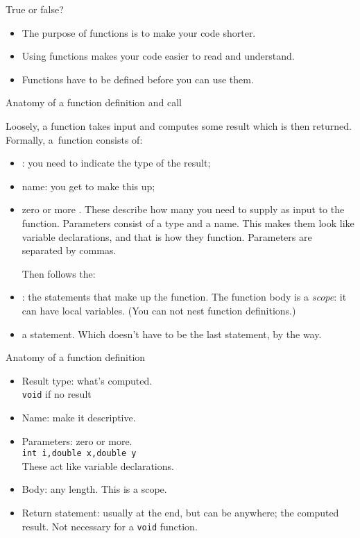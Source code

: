 \begin{review}
  \label{rev:func-why}
  True or false?
  \begin{itemize}
  \item The purpose of functions is to make your code shorter.
  \item Using functions makes your code easier to read and understand.
  \item Functions have to be defined before you can use them.
  \end{itemize}
\end{review}


 {Anatomy of a function definition and call}

Loosely, a function takes input and computes some result which is then returned.
Formally, a~function consists of:
\begin{itemize}
\item {}: you need to indicate
  the type of the result;
\item name: you get to make this up;
\item zero or more . These describe
  how many  you need to supply as
  input to the function. Parameters consist of a type and a name. This
  makes them look like variable declarations, and that is how they
  function. Parameters are separated by commas.

  Then follows the:
\item {}: the statements that make up
  the function. The function body is a \emph{scope}: it can have local
  variables. (You can not nest function definitions.)
\item a  statement. Which doesn't have to be
  the last statement, by the way.
\end{itemize}

\begin{slide}{Anatomy of a function definition}
  \label{sl:func-anatomy}
  \begin{itemize}
  \item Result type: what's computed.\\ \lstinline{void} if no result
  \item Name: make it descriptive.
  \item Parameters: zero or more.\\
    \lstinline{int i,double x,double y}\\
    These act like variable declarations.
  \item Body: any length. This is a scope.
  \item Return statement: usually at the end, but can be anywhere; the
    computed result. Not necessary for a \lstinline{void} function.
  \end{itemize}
\end{slide}

